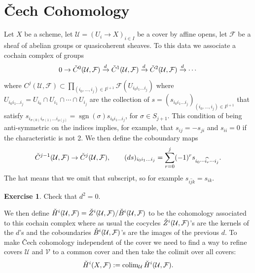 \documentclass[12pt]{article}
\numberwithin{equation}{section}
\theoremstyle{definition}
\newtheorem{exercise}[theorem]{Exercise}
\theoremstyle{remark}
\newcommand{\Fcal}{\mathcal{F}}
\newcommand{\Ucal}{\mathcal{U}}
\newcommand{\sgn}{\operatorname{sgn}}
\newcommand{\colim}{\operatorname{colim}}
\newcommand{\Cv}{\Check{C}}
\newcommand{\Wcal}{\mathcal{W}}
\newcommand{\Vcal}{\mathcal{V}}
\newcommand{\taylor}[1]{{\color{blue} \sf $\spadesuit\spadesuit\spadesuit$ Taylor: [#1]}}
\begin{document}
\section{\v{C}ech Cohomology}
Let $X$ be a scheme, let $\Ucal=(U_i \to X)_{i\in I}$ be a cover by affine opens, let $\Fcal$ be a sheaf of abelian groups or quasicoherent sheaves.
To this data we associate a cochain complex of groups
$$ 0 \to \Cv^0(\Ucal, \Fcal) \xrightarrow{d} \Cv^1(\Ucal,\Fcal) \xrightarrow{d}  \Cv^2(\Ucal,\Fcal) \xrightarrow{d} \cdots $$
where $C^j(\Ucal,\Fcal) \subset \prod_{(i_0,\ldots,i_j) \in I^{j+1}} \Fcal(U_{i_0i_1\ldots i_j})$ where $U_{i_0i_1\ldots i_j} = U_{i_0} \cap U_{i_1} \cap \cdots \cap U_{i_j}$ are the collection of $s=(s_{i_0i_1\ldots i_j})_{(i_0,\ldots,i_j)\in I^{j+1}}$ that satisfy 
$s_{i_{\sigma(0)}i_{\sigma(1)} \ldots i_{\sigma(j)} } = \sgn(\sigma) s_{i_0i_1\ldots i_j}$, for $\sigma \in S_{j+1}.$
This condition of being anti-symmetric on the indices implies, for example, that  $s_{ij}=-s_{ji}$ and $s_{ii}=0$ if the characteristic is not 2. 
We then define the coboundary maps \
$$\Cv^{j-1}(\Ucal,\Fcal) \to \Cv^j(\Ucal,\Fcal),\qquad 
 (ds)_{i_0i_1\ldots i_j} = \sum_{r=0}^j (-1)^r s_{i_0\cdots \widehat{i_r} \cdots  i_j}. $$
The hat means that we omit that subscript, so for example $s_{i\widehat{j}k} =s_{ik}$.
 \begin{exercise}
	Check that $d^2=0$.
\end{exercise}
We then define $\Check{H}^i(\Ucal,\Fcal) =\Check{Z}^i(\Ucal,\Fcal)/\Check{B}^i(\Ucal,\Fcal)$ to be the cohomology associated to this cochain complex where as usual the cocycles $\Check{Z}^i(\Ucal,\Fcal)$'s are the kernels of the $d$'s and the coboundaries $\Check{B}^i(\Ucal,\Fcal)$'s are the images of the previous $d$.
To make \v{C}ech cohomology independent of the cover we need to find a way to refine covers $\mathcal{U}$ and $\mathcal{V}$ to a common cover and then take the colimit over all covers:
 $$ \Check{H}^i(X,\Fcal) := \colim_{\Ucal} \Check{H}^i(\Ucal,\Fcal). $$ 

\end{document}

